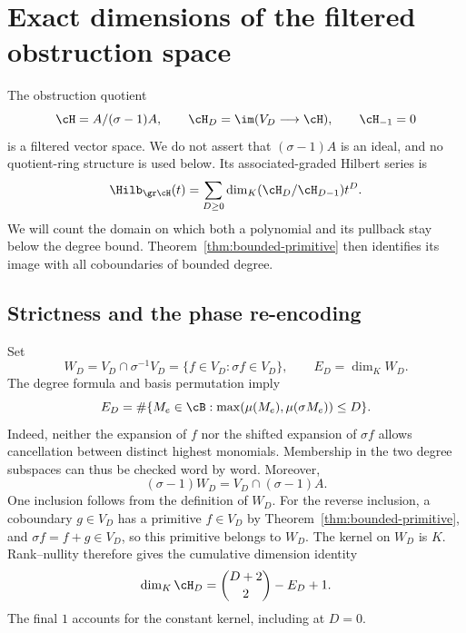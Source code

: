 \section{Exact dimensions of the filtered obstruction space}
\label{sec:hilbert-series}

The obstruction quotient
\[
  \cH=A/(\sigma-1)A,\qquad
  \cH_D=\im(V_D\longrightarrow\cH),\qquad \cH_{-1}=0
\]
is a filtered vector space.  We do not assert that $(\sigma-1)A$
is an ideal, and no quotient-ring structure is used below.  Its
associated-graded Hilbert series is
\begin{equation}
  \Hilb_{\gr\cH}(t)
    =\sum_{D\ge0}\dim_K(\cH_D/\cH_{D-1})t^D.
  \label{eq:filtered-hilbert-definition}
\end{equation}
We will count the domain on which both a polynomial and its pullback
stay below the degree bound.  Theorem~\ref{thm:bounded-primitive}
then identifies its image with all coboundaries of bounded degree.

\subsection{Strictness and the phase re-encoding}

Set
\[
  W_D=V_D\cap\sigma^{-1}V_D
     =\{f\in V_D:\sigma f\in V_D\},\qquad E_D=\dim_K W_D.
\]
The degree formula and basis permutation imply
\begin{equation}
  E_D=\#\{M_e\in\cB:
       \max(\mu(M_e),\mu(\sigma M_e))\le D\}.
  \label{eq:two-degree-count}
\end{equation}
Indeed, neither the expansion of $f$ nor the shifted expansion of
$\sigma f$ allows cancellation between distinct highest monomials.
Membership in the two degree subspaces can thus be checked word by word.
Moreover,
\begin{equation}
  (\sigma-1)W_D=V_D\cap(\sigma-1)A.
  \label{eq:strict-filtered-image}
\end{equation}
One inclusion follows from the definition of $W_D$.  For the reverse
inclusion, a coboundary $g\in V_D$ has a primitive $f\in V_D$ by
Theorem~\ref{thm:bounded-primitive}, and $\sigma f=f+g\in V_D$,
so this primitive belongs to $W_D$.  The kernel on $W_D$ is $K$.
Rank--nullity therefore gives the cumulative dimension identity
\begin{equation}
  \dim_K\cH_D=\binom{D+2}{2}-E_D+1.
  \label{eq:filtered-dimension}
\end{equation}
The final $1$ accounts for the constant kernel, including at $D=0$.

